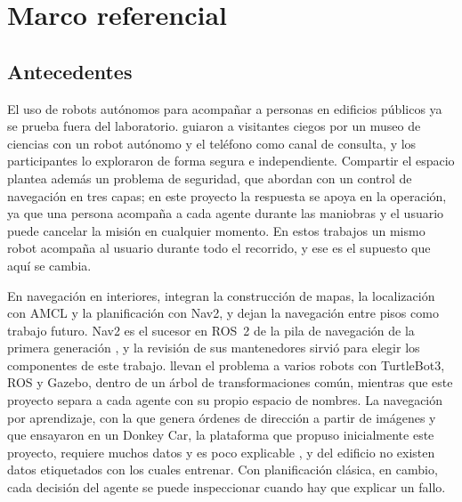 \chapter{Marco referencial}
\label{cap:marco}

\section{Antecedentes}
\label{sec:antecedentes}

El uso de robots autónomos para acompañar a personas en edificios públicos ya se prueba fuera del laboratorio. \textcite{kayukawa2023enhancing} guiaron a visitantes ciegos por un museo de ciencias con un robot autónomo y el teléfono como canal de consulta, y los participantes lo exploraron de forma segura e independiente. Compartir el espacio plantea además un problema de seguridad, que \textcite{omer2025multilayer} abordan con un control de navegación en tres capas; en este proyecto la respuesta se apoya en la operación, ya que una persona acompaña a cada agente durante las maniobras y el usuario puede cancelar la misión en cualquier momento. En estos trabajos un mismo robot acompaña al usuario durante todo el recorrido, y ese es el supuesto que aquí se cambia.

En navegación en interiores, \textcite{sojan2025autonomous} integran la construcción de mapas, la localización con AMCL y la planificación con Nav2, y dejan la navegación entre pisos como trabajo futuro. Nav2 es el sucesor en ROS~2 de la pila de navegación de la primera generación \autocite{macenski2020marathon}, y la revisión de sus mantenedores \autocite{macenski2023survey} sirvió para elegir los componentes de este trabajo. \textcite{varghese2023multirobot} llevan el problema a varios robots con TurtleBot3, ROS y Gazebo, dentro de un árbol de transformaciones común, mientras que este proyecto separa a cada agente con su propio espacio de nombres. La navegación por aprendizaje, con la que \textcite{zain2025obstacle} genera órdenes de dirección a partir de imágenes y que \textcite{lopez2024enhancing} ensayaron en un Donkey Car, la plataforma que propuso inicialmente este proyecto, requiere muchos datos y es poco explicable \autocite{xiao2022motion}, y del edificio no existen datos etiquetados con los cuales entrenar. Con planificación clásica, en cambio, cada decisión del agente se puede inspeccionar cuando hay que explicar un fallo.

